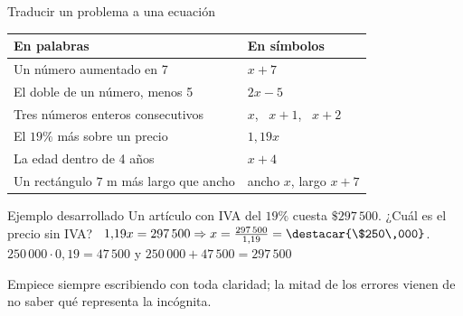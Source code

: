 \documentclass[aspectratio=169,10pt]{beamer}
\begin{document}
\begin{frame}{Traducir un problema a una ecuación}
  \scriptsize
  \begin{center}
  \begin{tabular}{@{}p{5.6cm}p{6.4cm}@{}}
    \toprule
    \textbf{En palabras} & \textbf{En símbolos} \\
    \midrule
    Un número aumentado en 7 & $x+7$ \\
    El doble de un número, menos 5 & $2x-5$ \\
    Tres números enteros consecutivos & $x$, \ $x+1$, \ $x+2$ \\
    El $19\%$ más sobre un precio & $1{,}19x$ \\
    La edad dentro de 4 años & $x+4$ \\
    Un rectángulo $7$ m más largo que ancho & ancho $x$, largo $x+7$ \\
    \bottomrule
  \end{tabular}
  \end{center}

  \vspace{0.02cm}
  \begin{exampleblock}{Ejemplo desarrollado}
    \tiny
    Un artículo con IVA del $19\%$ cuesta $\$297\,500$. ¿Cuál es el precio
    sin IVA? \ $1{,}19x = 297\,500 \Rightarrow
    x = \tfrac{297\,500}{1{,}19} = \destacar{\$250\,000}$.
    \  $250\,000\cdot 0{,}19 = 47\,500$ y
    $250\,000+47\,500 = 297\,500$ \checkmark
  \end{exampleblock}

  \vspace{0.02cm}
  {\tiny\color{uniGris}  Empiece siempre escribiendo  con toda claridad; la mitad de los errores vienen de no saber qué
  representa la incógnita.}
\end{frame}
\end{document}
